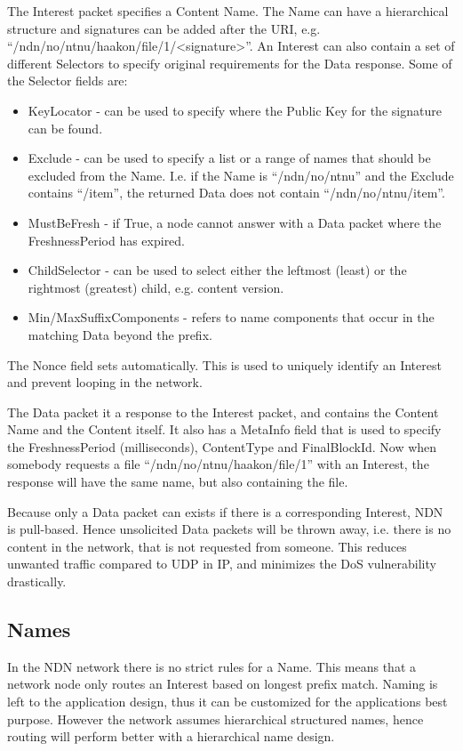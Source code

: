 The Interest packet specifies a Content Name. 
The Name can have a hierarchical structure and signatures can be added after the \gls{URI}, e.g. ``/ndn/no/ntnu/haakon/file/1/<signature>''.
An Interest can also contain a set of different Selectors to specify original requirements for the Data response. 
Some of the Selector fields are:
\begin{itemize}
  \item KeyLocator - can be used to specify where the Public Key for the signature can be found.
  \item Exclude - can be used to specify a list or a range of names that should be excluded from the Name. 
  I.e. if the Name is ``/ndn/no/ntnu'' and the Exclude contains ``/item'', the returned Data does not contain ``/ndn/no/ntnu/item''.
  \item MustBeFresh - if True, a node cannot answer with a Data packet where the FreshnessPeriod has expired.
  \item ChildSelector - can be used to select either the leftmost (least) or the rightmost (greatest) child, e.g. content version. 
  \item Min/MaxSuffixComponents - refers to name components that occur in the matching Data beyond the prefix. 
\end{itemize}
The Nonce field sets automatically. 
This is used to uniquely identify an Interest and prevent looping in the network.

The Data packet it a response to the Interest packet, and contains the Content Name and the Content itself.
It also has a MetaInfo field that is used to specify the FreshnessPeriod (milliseconds), ContentType and FinalBlockId. 
Now when somebody requests a file ``/ndn/no/ntnu/haakon/file/1'' with an Interest, the response will have the same name, but also containing the file.

Because only a Data packet can exists if there is a corresponding Interest, \gls{NDN} is pull-based.
Hence unsolicited Data packets will be thrown away, i.e. there is no content in the network, that is not requested from someone.
This reduces unwanted traffic compared to \gls{UDP} in \gls{IP}, and minimizes the \gls{DoS} vulnerability drastically.

\subsection{Names}\label{name}
In the \gls{NDN} network there is no strict rules for a Name.
This means that a network node only routes an Interest based on longest prefix match.
Naming is left to the application design, thus it can be customized for the applications best purpose.
However the network assumes hierarchical structured names, hence routing will perform better with a hierarchical name design.

